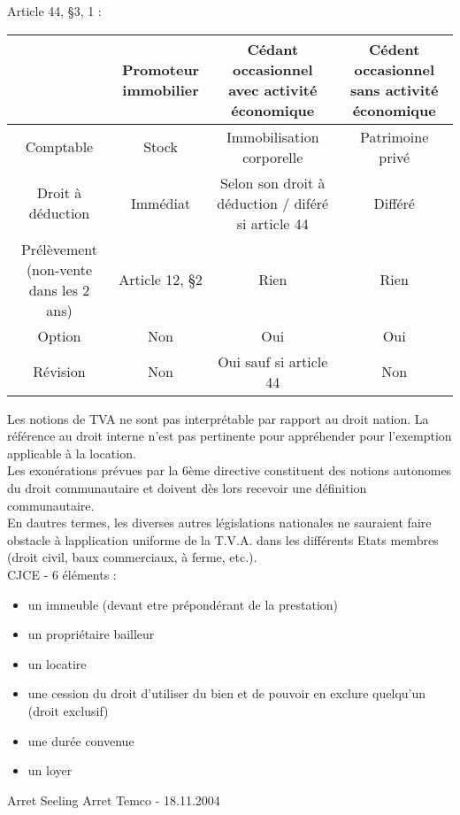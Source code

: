\documentclass{book}
\begin{document}
Article 44, §3, 1 :\\
\begin{tabular}{|c|c|c|c|}
  \hline
   & Promoteur immobilier & Cédant occasionnel avec activité économique & Cédent occasionnel sans activité économique \\
  \hline
  	Comptable & Stock & Immobilisation corporelle & Patrimoine privé\\
     \hline    
    Droit à déduction & Immédiat & Selon son droit à déduction / diféré si article 44 & Différé\\
     \hline   
    Prélèvement (non-vente dans les 2 ans) & Article 12, §2 & Rien & Rien\\
     \hline
    Option & Non & Oui & Oui\\
     \hline
    Révision & Non & Oui sauf si article 44 & Non\\
  \hline
\end{tabular}

\null

Les notions de TVA ne sont pas interprétable par rapport au droit nation. La référence au droit interne n'est pas pertinente pour appréhender pour l'exemption applicable à la location. \\

Les exonérations prévues par la 6ème directive constituent des notions autonomes du droit communautaire et doivent dès lors recevoir une définition communautaire.\\

En dautres termes, les diverses autres législations nationales ne sauraient faire obstacle à lapplication
uniforme de la T.V.A. dans les différents Etats membres (droit civil, baux commerciaux, à ferme, etc.).\\



CJCE - 6 éléments :

\begin{itemize}
\item un immeuble (devant etre prépondérant de la prestation)
\item un propriétaire bailleur
\item un locatire
\item une cession du droit d'utiliser du bien et de pouvoir en exclure quelqu'un (droit exclusif)
\item une durée convenue
\item un loyer
\end{itemize}

Arret Seeling
Arret Temco - 18.11.2004
\end{document}
